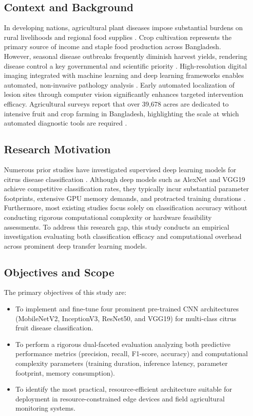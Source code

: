 \documentclass{ijcaArticle}
\begin{document}
\subsection{Context and Background}

In developing nations, agricultural plant diseases impose substantial burdens on rural livelihoods and regional food supplies \cite{p6,p8}. Crop cultivation represents the primary source of income and staple food production across Bangladesh. However, seasonal disease outbreaks frequently diminish harvest yields, rendering disease control a key governmental and scientific priority \cite{p6}. High-resolution digital imaging integrated with machine learning and deep learning frameworks enables automated, non-invasive pathology analysis \cite{p19,p20}. Early automated localization of lesion sites through computer vision significantly enhances targeted intervention efficacy. Agricultural surveys report that over 39,678 acres are dedicated to intensive fruit and crop farming in Bangladesh, highlighting the scale at which automated diagnostic tools are required \cite{p7,p6}.

\subsection{Research Motivation}

Numerous prior studies have investigated supervised deep learning models for citrus disease classification \cite{p2, p5, p8}. Although deep models such as AlexNet and VGG19 achieve competitive classification rates, they typically incur substantial parameter footprints, extensive GPU memory demands, and protracted training durations \cite{p5}. Furthermore, most existing studies focus solely on classification accuracy without conducting rigorous computational complexity or hardware feasibility assessments. To address this research gap, this study conducts an empirical investigation evaluating both classification efficacy and computational overhead across prominent deep transfer learning models.

\subsection{Objectives and Scope}
The primary objectives of this study are:
\begin{itemize}
    \item To implement and fine-tune four prominent pre-trained CNN architectures (MobileNetV2, InceptionV3, ResNet50, and VGG19) for multi-class citrus fruit disease classification.
    \item To perform a rigorous dual-faceted evaluation analyzing both predictive performance metrics (precision, recall, F1-score, accuracy) and computational complexity parameters (training duration, inference latency, parameter footprint, memory consumption).
    \item To identify the most practical, resource-efficient architecture suitable for deployment in resource-constrained edge devices and field agricultural monitoring systems.
\end{itemize}
\end{document}
